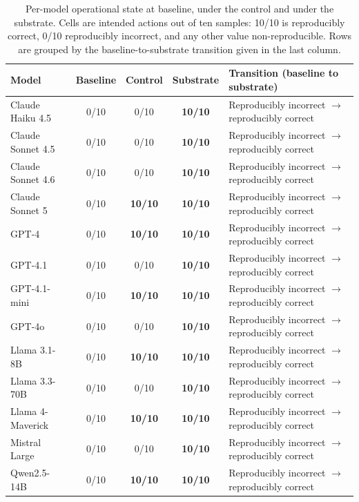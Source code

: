 \begin{table}[h]
\centering
\caption{Per-model operational state at baseline, under the control and under the
substrate. Cells are intended actions out of ten samples: 10/10 is reproducibly
correct, 0/10 reproducibly incorrect, and any other value non-reproducible. Rows are
grouped by the baseline-to-substrate transition given in the last column.}
\label{tab:per-model}
\footnotesize
\begin{tabular}{lcccl}
\toprule
Model & Baseline & Control & Substrate & Transition (baseline to substrate) \\
\midrule
Claude Haiku 4.5 & 0/10 & 0/10 & \textbf{10/10} & Reproducibly incorrect $\rightarrow$ reproducibly correct \\
Claude Sonnet 4.5 & 0/10 & 0/10 & \textbf{10/10} & Reproducibly incorrect $\rightarrow$ reproducibly correct \\
Claude Sonnet 4.6 & 0/10 & 0/10 & \textbf{10/10} & Reproducibly incorrect $\rightarrow$ reproducibly correct \\
Claude Sonnet 5 & 0/10 & \textbf{10/10} & \textbf{10/10} & Reproducibly incorrect $\rightarrow$ reproducibly correct \\
GPT-4 & 0/10 & \textbf{10/10} & \textbf{10/10} & Reproducibly incorrect $\rightarrow$ reproducibly correct \\
GPT-4.1 & 0/10 & 0/10 & \textbf{10/10} & Reproducibly incorrect $\rightarrow$ reproducibly correct \\
GPT-4.1-mini & 0/10 & \textbf{10/10} & \textbf{10/10} & Reproducibly incorrect $\rightarrow$ reproducibly correct \\
GPT-4o & 0/10 & 0/10 & \textbf{10/10} & Reproducibly incorrect $\rightarrow$ reproducibly correct \\
Llama 3.1-8B & 0/10 & \textbf{10/10} & \textbf{10/10} & Reproducibly incorrect $\rightarrow$ reproducibly correct \\
Llama 3.3-70B & 0/10 & 0/10 & \textbf{10/10} & Reproducibly incorrect $\rightarrow$ reproducibly correct \\
Llama 4-Maverick & 0/10 & \textbf{10/10} & \textbf{10/10} & Reproducibly incorrect $\rightarrow$ reproducibly correct \\
Mistral Large & 0/10 & 0/10 & \textbf{10/10} & Reproducibly incorrect $\rightarrow$ reproducibly correct \\
Qwen2.5-14B & 0/10 & \textbf{10/10} & \textbf{10/10} & Reproducibly incorrect $\rightarrow$ reproducibly correct \\

\end{tabular}
\end{table}

